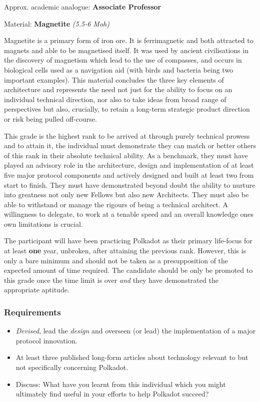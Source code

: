 \documentclass[9pt,oneside]{amsart}
\begin{document}
Approx. academic analogue: \textbf{Associate Professor}

Material: \textbf{Magnetite} \emph{(5.5-6 Moh)}

Magnetite is a primary form of iron ore. It is ferrimagnetic and both attracted to magnets and able to be magnetised itself. It was used by ancient civilisations in the discovery of magnetism which lead to the use of compasses, and occurs in biological cells used as a navigation aid (with birds and bacteria being two important examples). This material concludes the three key elements of architecture and represents the need not just for the ability to focus on an individual technical direction, nor also to take ideas from broad range of perspectives but also, crucially, to retain a long-term strategic product direction or risk being pulled off-course.

This grade is the highest rank to be arrived at through purely technical prowess and to attain it, the individual must demonstrate they can match or better others of this rank in their absolute technical ability. As a benchmark, they must have played an advisory role in the architecture, design and implementation of at least five major protocol components and actively designed and built at least two from start to finish. They must have demonstrated beyond doubt the ability to nurture into greatness not only new Fellows but also new Architects. They must also be able to withstand or manage the rigours of being a technical architect. A willingness to delegate, to work at a tenable speed and an overall knowledge ones own limitations is crucial.

The participant will have been practicing Polkadot as their primary life-focus for at least \textbf{one} year, unbroken, after attaining the previous rank. However, this is only a bare minimum and should not be taken as a presupposition of the expected amount of time required. The candidate should be only be promoted to this grade once the time limit is over \emph{and} they have demonstrated the appropriate aptitude.

\subsubsection{Requirements}\label{requirements-6}

\begin{itemize}
\item \emph{Devised}, lead the \emph{design} and overseen (or lead) the implementation of a major protocol innovation.
\item At least three published long-form articles about technology relevant to but not specifically concerning Polkadot.
\item Discuss: What have you learnt from this individual which you might ultimately find useful in your efforts to help Polkadot succeed?
\end{itemize}
\end{document}
